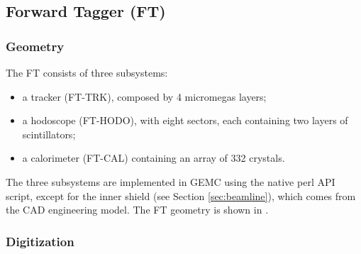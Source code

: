 \subsection{Forward Tagger (FT)}


\subsubsection{Geometry}

The FT consists of three subsystems:

\begin{itemize}
	\item a tracker (FT-TRK), composed by 4 micromegas layers;
	\item a hodoscope (FT-HODO), with eight sectors, each containing two layers of scintillators;
 	\item a calorimeter (FT-CAL) containing an array of 332 crystals.
\end{itemize}

The three subsystems are implemented in GEMC using the native perl API script, except for the inner shield (see Section \ref{sec:beamline}),
which comes from the CAD engineering model.
The FT geometry is shown in .

\subsubsection{Digitization}

